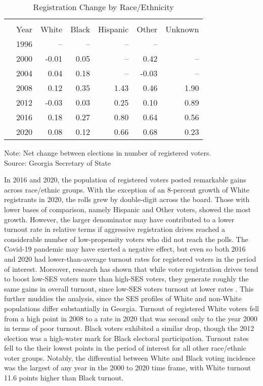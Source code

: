 \begin{table}[ht]
\centering
\begin{threeparttable}
\caption{Registration Change by Race/Ethnicity}  
\label{tab:chg-reg-race}
\begin{tabular}{rrrrrrr}
  \hline \\ \vspace{0.5em} 
 & Year & White & Black & Hispanic & Other & Unknown  \vspace{0.5em} \\ 
  \hline
 & 1996 &--  &--  & -- & -- &  \\ 
   & 2000 & -0.01 & 0.05 & -- & 0.42 & -- \\ 
   & 2004 & 0.04 & 0.18 &--  & -0.03 & -- \\ 
   & 2008 & 0.12 & 0.35 & 1.43 & 0.46 & 1.90 \\ 
   & 2012 & -0.03 & 0.03 & 0.25 & 0.10 & 0.89 \\ 
   & 2016 & 0.18 & 0.27 & 0.80 & 0.64 & 0.56 \\ 
   & 2020 & 0.08 & 0.12 & 0.66 & 0.68 & 0.23\vspace{0.5em} \\ 
   \hline
\end{tabular}
{\footnotesize Note: Net change between elections in number of registered voters.}\\
{\footnotesize Source: Georgia Secretary of State}
\end{threeparttable}
\end{table}



In 2016 and 2020, the population of registered voters posted remarkable gains across race/ethnic groups. With the exception of an 8-percent growth of White registrants in 2020, the rolls grew by double-digit across the board. Those with lower bases of comparison, namely Hispanic and Other voters, showed the most growth. However, the larger denominator may have contributed to a lower turnout rate in relative terms if aggressive registration drives reached a considerable number of low-propensity voters who did not reach the polls. The Covid-19 pandemic may have exerted a negative effect, but even so both 2016 and 2020 had lower-than-average turnout rates for registered voters in the period of interest. Moreover, research has shown that while voter registration drives tend to boost low-SES voters more than high-SES voters, they generate roughly the same gains in overall turnout, since low-SES voters turnout at lower rates \citep{nickerson_voter_2015}. This further muddies the analysis, since the SES profiles of White and non-White populations differ substantially in Georgia. Turnout of registered White voters fell from a high point in 2008 to a rate in 2020 that was second only to the year 2000 in terms of poor turnout. Black voters exhibited a similar drop, though the 2012 election was a high-water mark for Black electoral participation. Turnout rates fell to the their lowest points in the period of interest for all other race/ethnic voter groups. Notably, the differential between White and Black voting incidence was the largest of any year in the 2000 to 2020 time frame, with White turnout 11.6 points higher than Black turnout.



